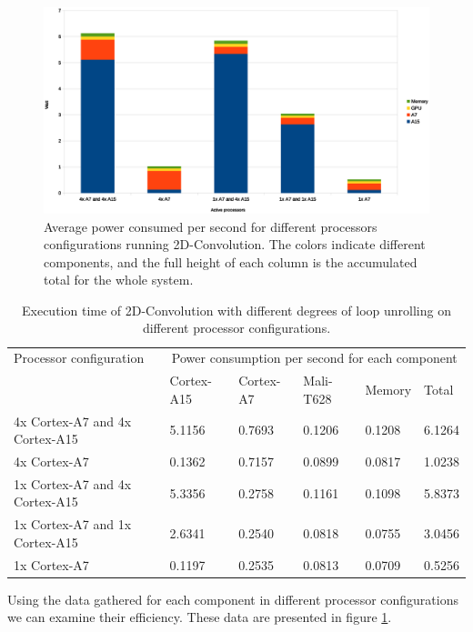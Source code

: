 \begin{figure}[H]
  \centering
  \includegraphics[width=160mm]{fig/power-configurations.eps}
  \caption{Average power consumed per second for different processors configurations running 2D-Convolution. The colors indicate different components, and the full height of each column is the accumulated total for the whole system.\label{overflow}} \label{power-configurations}
\end{figure}

\begin{table}[H]
  \begin{tabular}{llllll}
    \toprule
    Processor configuration         & \multicolumn{5}{c}{Power consumption per second for each component} \\
                                    & Cortex-A15  & Cortex-A7 & Mali-T628 & Memory  & Total \\
    \midrule
    4x Cortex-A7 and 4x Cortex-A15  & 5.1156          & 0.7693        & 0.1206        & 0.1208  & 6.1264 \\
    4x Cortex-A7                    & 0.1362          & 0.7157        & 0.0899        & 0.0817  & 1.0238 \\
    1x Cortex-A7 and 4x Cortex-A15  & 5.3356          & 0.2758        & 0.1161        & 0.1098  & 5.8373 \\
    1x Cortex-A7 and 1x Cortex-A15  & 2.6341          & 0.2540        & 0.0818        & 0.0755  & 3.0456 \\
    1x Cortex-A7                    & 0.1197          & 0.2535        & 0.0813        & 0.0709  & 0.5256 \\
    \bottomrule
  \end{tabular}
  \caption{Execution time of 2D-Convolution with different degrees of loop unrolling on different processor configurations. \label{overflow}}
\end{table}
Using the data gathered for each component in different processor configurations we can examine their efficiency.
These data are presented in figure \ref{power-configurations}.

